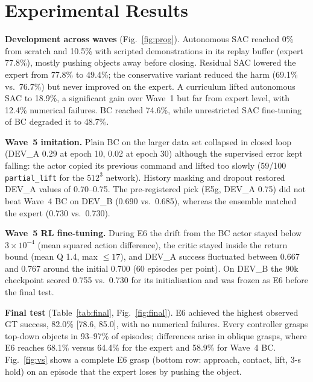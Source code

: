 \documentclass[conference,10pt]{IEEEtran}
\begin{document}
\section{Experimental Results}\label{sec:results}
\textbf{Development across waves} (Fig.~\ref{fig:prog}). Autonomous SAC reached 0\% from scratch and 10.5\% with scripted
demonstrations in its replay buffer (expert 77.8\%), mostly pushing objects away before closing. Residual SAC lowered the
expert from 77.8\% to 49.4\%; the conservative variant reduced the harm (69.1\% vs.\ 76.7\%) but never improved on the
expert. A curriculum lifted autonomous SAC to 18.9\%, a significant gain over Wave~1 but far from expert level, with 12.4\%
numerical failures. BC reached 74.6\%, while unrestricted SAC fine-tuning of BC degraded it to 48.7\%.

\textbf{Wave~5 imitation.} Plain BC on the larger data set collapsed in closed loop (DEV\_A 0.29 at epoch 10, 0.02 at epoch 30)
although the supervised error kept falling: the actor copied its previous command and lifted too slowly (59/100
\texttt{partial\_lift} for the $512^3$ network). History masking and dropout restored DEV\_A values of 0.70--0.75. The
pre-registered pick (E5g, DEV\_A 0.75) did not beat Wave~4 BC on DEV\_B (0.690 vs.\ 0.685), whereas the ensemble matched the
expert (0.730 vs.\ 0.730).

\textbf{Wave~5 RL fine-tuning.} During E6 the drift from the BC actor stayed below $3\times10^{-4}$ (mean squared action
difference), the critic stayed inside the return bound (mean Q 1.4, max $\le17$), and DEV\_A success fluctuated between 0.667
and 0.767 around the initial 0.700 (60 episodes per point). On DEV\_B the 90k checkpoint scored 0.755 vs.\ 0.730 for its
initialisation and was frozen as E6 before the final test.

\textbf{Final test} (Table~\ref{tab:final}, Fig.~\ref{fig:final}). E6 achieved the highest observed GT success, 82.0\%
[78.6, 85.0], with no numerical failures. Every controller grasps top-down objects in 93--97\% of episodes; differences arise
in oblique grasps, where E6 reaches 68.1\% versus 64.4\% for the expert and 58.9\% for Wave~4 BC. Fig.~\ref{fig:vs} shows a complete E6 grasp (bottom row: approach, contact, lift, 3-s hold) on an
episode that the expert loses by pushing the object.
\end{document}
